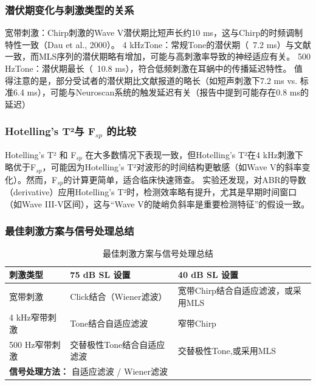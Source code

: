 \subsubsection{潜伏期变化与刺激类型的关系}
宽带刺激：Chirp刺激的Wave V潜伏期比短声长约10 ms，这与Chirp的时频调制特性一致（Dau et al., 2000）。
4 kHzTone：常规Tone的潜伏期（~7.2 ms）与文献一致，而MLS序列的潜伏期略有增加，可能与高刺激率导致的神经适应有关。
500 HzTone：潜伏期最长（~10.8 ms），符合低频刺激在耳蜗中的传播延迟特性。
值得注意的是，部分受试者的潜伏期比文献报道的略长（如短声刺激下7.2 ms vs. 标准6.4 ms），可能与Neuroscan系统的触发延迟有关（报告中提到可能存在0.8 ms的延迟）
\subsubsection{Hotelling's T²与 F$_{sp}$ 的比较}
Hotelling's T² 和 F$_{sp}$ 在大多数情况下表现一致，但Hotelling's T²在4 kHz刺激下略优于F$_{sp}$，可能因为Hotelling's T²对波形的时间结构更敏感（如Wave V的斜率变化）。然而，F$_{sp}$的计算更简单，适合临床快速筛查。
实验还发现，对ABR的导数（derivative）应用Hotelling's T²时，检测效率略有提升，尤其是早期时间窗口（如Wave III-V区间），这与“Wave V的陡峭负斜率是重要检测特征”的假设一致。


\subsubsection{最佳刺激方案与信号处理总结}
\begin{table}[H]
\centering
\caption{最佳刺激方案与信号处理总结}
\label{tab:beststimulusSignalProcessing}
\begin{tabular}{|l|p{5.5cm}|p{5.5cm}|}
\hline
\textbf{刺激类型} & \textbf{75 dB SL 设置} & \textbf{40 dB SL 设置} \\
\hline
宽带刺激 & 
Click结合（Wiener滤波） &
宽带Chirp结合自适应滤波，或采用MLS\\
\hline
4 kHz窄带刺激 & 
Tone结合自适应滤波 &
窄带Chirp\\
\hline
500 Hz窄带刺激& 
交替极性Tone结合自适应滤波 &
交替极性Tone,或采用MLS \\
\hline
\multicolumn{3}{|l|}{\textbf{信号处理方法：} 自适应滤波 / Wiener滤波} \\
\hline
\end{tabular}
\end{table}
